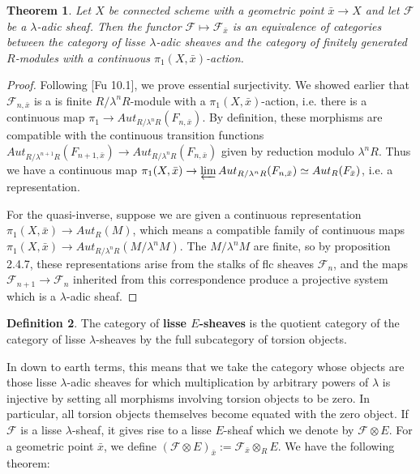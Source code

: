 \documentclass{ucbthesis}
\newtheorem{thm}{Theorem}[section]
\theoremstyle{definition}
\newtheorem{defn}[thm]{Definition}
\theoremstyle{theorem}
\begin{document}
\begin{thm}
Let $X$ be connected scheme with a geometric point $\bar{x}\rightarrow X$ and let $\mathcal{F}$ be a $\lambda$-adic sheaf. Then the functor $\mathcal{F} \mapsto \mathcal{F}_{\bar{x}}$ is an equivalence of categories between the category of lisse $\lambda$-adic sheaves and the category of finitely generated $R$-modules with a continuous $\pi_{1}(X,\bar{x})$-action. 
\end{thm}

\begin{proof}Following [Fu 10.1], we prove essential surjectivity. We showed earlier that $\mathcal{F}_{n,\bar{x}}$ is a is finite $R/{\lambda}^{n}R$-module with
 a $\pi_{1}(X,\bar{x})$-action, i.e. there is a continuous map $\pi_{1} \rightarrow Aut_{R/{\lambda}^{n}R}
 (F_{n,\bar{x}})$. By definition, these morphisms are compatible with the continuous transition functions 
 $Aut_{R/\lambda^{n+1}R}(F_{n+1,\bar{x}}) \rightarrow Aut_{R/\lambda^{n}R}(F_{n,\bar{x}})$ given by reduction modulo $\lambda^{n}R$. Thus we have a continuous map  $\pi_{1}(X,\bar{x})\rightarrow \varprojlim 
 Aut_{R/\lambda^{n}R}(F_{n,\bar{x}})\simeq Aut_{R}(F_{\bar{x}})$, i.e. a representation.

For the quasi-inverse, suppose we are given a continuous representation $\pi_{1}(X,\bar{x})\rightarrow Aut_{R}(M)$, which means a compatible family of continuous maps $\pi_{1}(X,\bar{x})\rightarrow Aut_{R/\lambda^{n}R}(M/\lambda^{n}M)$. The $M/\lambda^{n}M$ are finite, so by proposition 2.4.7, these representations arise from the stalks of flc sheaves $\mathcal{F}_{n}$, and the maps $\mathcal{F}_{n+1} \rightarrow \mathcal{F}_{n}$ inherited from this correspondence produce a projective system which is a $\lambda$-adic sheaf. 
\end{proof}

\begin{defn} The category of \textbf{lisse $E$-sheaves} is the quotient category of the category of lisse $\lambda$-sheaves by the full subcategory of torsion objects.
\end{defn} 

In down to earth terms, this means that we take the category whose objects are those lisse $\lambda$-adic sheaves for which multiplication by arbitrary powers of $\lambda$ is injective by setting all morphisms involving torsion objects to be zero. In particular, all torsion objects themselves become equated with the zero object. If $\mathcal{F}$ is a lisse $\lambda$-sheaf, it gives rise to a lisse $E$-sheaf which we denote by $\mathcal{F}\otimes E$. For a geometric point $\bar{x}$, we define $(\mathcal{F}\otimes E)_{\bar{x}}:= \mathcal{F}_{\bar{x}}\otimes_{R}E$. We have the following theorem:
\end{document}
